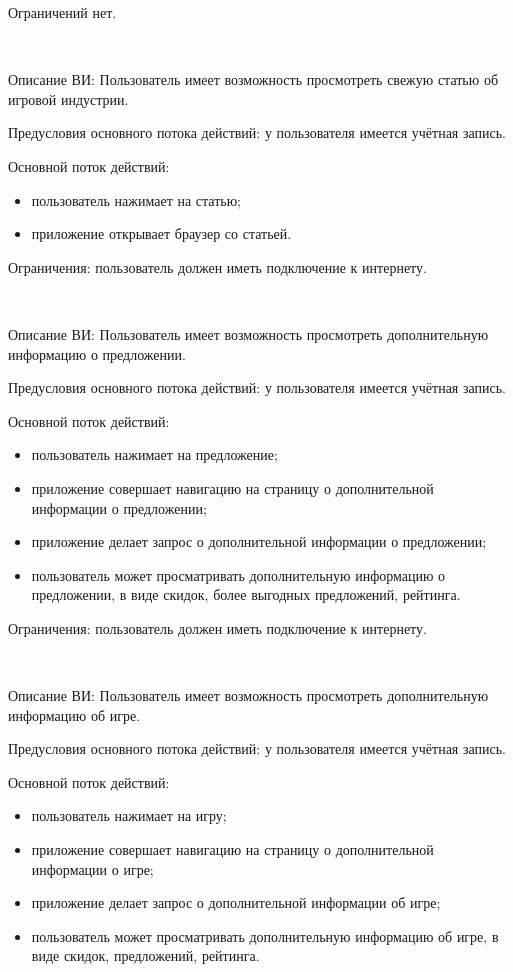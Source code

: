 Ограничений нет.

~\par
\label{use:join}
Описание ВИ: Пользователь имеет возможность просмотреть свежую статью об игровой индустрии.
 
Предусловия основного потока действий: у пользователя имеется учётная запись.
 
Основной поток действий:
\begin{itemize}
   \item пользователь нажимает на статью;
   \item приложение открывает браузер со статьей.
\end{itemize}
 
Ограничения: пользователь должен иметь подключение к интернету.
 
~\par
Описание ВИ: Пользователь имеет возможность просмотреть дополнительную информацию о предложении.
 
Предусловия основного потока действий: у пользователя имеется учётная запись.

Основной поток действий:
\begin{itemize}
   \item пользователь нажимает на предложение;
   \item приложение совершает навигацию на страницу о дополнительной информации о предложении;
   \item приложение делает запрос о дополнительной информации о предложении;
   \item пользователь может просматривать дополнительную информацию о предложении, в виде скидок, более выгодных предложений, рейтинга.
\end{itemize}
 
Ограничения: пользователь должен иметь подключение к интернету.
 
~\par
Описание ВИ: Пользователь имеет возможность просмотреть дополнительную информацию об игре.
 
Предусловия основного потока действий: у пользователя имеется учётная запись.

Основной поток действий:
\begin{itemize}
   \item пользователь нажимает на игру;
   \item приложение совершает навигацию на страницу о дополнительной информации о игре;
   \item приложение делает запрос о дополнительной информации об игре;
   \item пользователь может просматривать дополнительную информацию об игре, в виде скидок, предложений, рейтинга.
\end{itemize}
 
